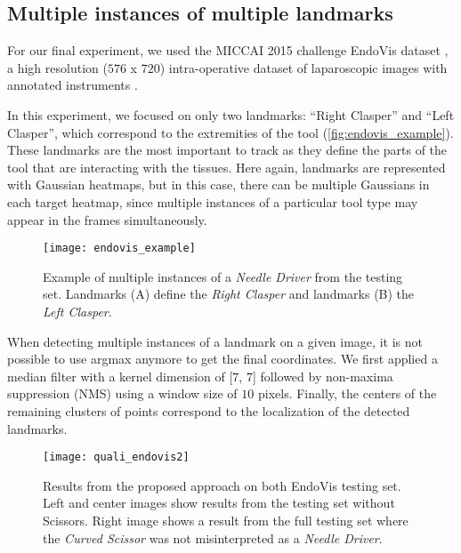 \documentclass[10pt,twocolumn,letterpaper]{article}
\begin{document}
\subsection{Multiple instances of multiple landmarks}


For our final experiment, we used the MICCAI 2015 challenge EndoVis dataset \cite{endovis}, a high resolution ($576$ x $720$) intra-operative dataset of laparoscopic images with annotated
instruments \cite{tmi}.

In this experiment, we focused on only two landmarks: ``Right Clasper''
and ``Left Clasper'', which correspond to the extremities of the tool
(\autoref{fig:endovis_example}). These landmarks are the most important to track as
they define the parts of the tool that are interacting with the tissues. Here again,
landmarks are represented with Gaussian heatmaps, but in this case,
there can be multiple Gaussians in each target heatmap, since multiple instances of a particular tool type may appear in the frames simultaneously.

\begin{figure}[H]
  \begin{center}
    \centering
	\texttt{[image: endovis\_example]}
	\caption{Example of multiple instances of a \textit{Needle Driver} from the testing set.
          Landmarks (A) define the \textit{Right Clasper} and landmarks (B)
          the \textit{Left Clasper}.}
	\label{fig:endovis_example}
  \end{center}
\end{figure}

When detecting multiple instances of a landmark on a given image, it
is not possible to use argmax anymore to get the final coordinates.
We first applied a median filter with a kernel dimension of [$7$, $7$]
followed by non-maxima suppression (NMS) using a window size of $10$
pixels.  Finally, the centers of the remaining clusters of points
correspond to the localization of the detected landmarks.

\begin{figure*}[ht]
  \begin{center}
    \centering
	\texttt{[image: quali\_endovis2]}
	\caption{Results from the proposed approach on both EndoVis testing set.
          Left and center images show results from the testing set without Scissors.
          Right image shows a result from the full testing set where the
          \textit{Curved Scissor} was not misinterpreted as a \textit{Needle Driver}.}
	\label{fig:quali_endovis}
  \end{center}
\end{figure*}
\end{document}
